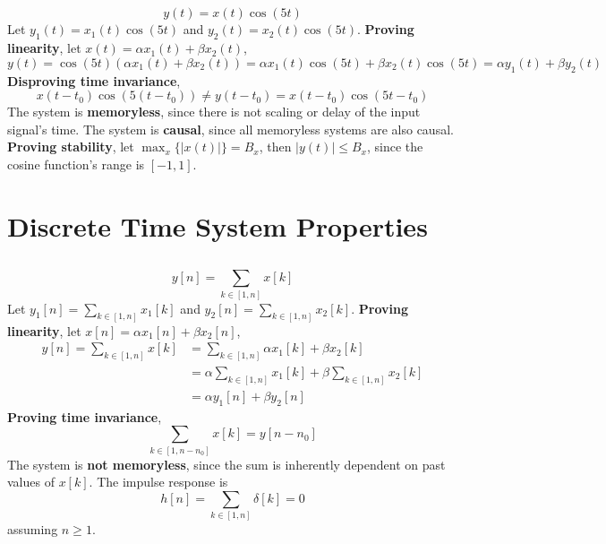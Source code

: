 \documentclass{article}
\begin{document}
\subsection{}

\begin{equation}
    y(t) = x(t) \cos(5t)
\end{equation}
Let \(y_1(t) = x_1(t) \cos(5t)\) and \(y_2(t) = x_2(t) \cos(5t)\).
\textbf{Proving linearity}, let \(x(t) = \alpha x_1(t) + \beta x_2(t)\),
\begin{equation}
    y(t) = \cos(5t) (\alpha x_1(t) + \beta x_2(t)) = \alpha x_1(t) \cos(5t) + \beta x_2(t) \cos(5t) = \alpha y_1(t) + \beta y_2(t)
\end{equation}
\textbf{Disproving time invariance},
\begin{equation}
    x(t - t_0) \cos(5 (t - t_0)) \neq y(t - t_0) = x(t - t_0) \cos(5t - t_0)
\end{equation}
The system is \textbf{memoryless}, since there is not scaling or delay of the input signal's time.
The system is \textbf{causal}, since all memoryless systems are also causal.
\textbf{Proving stability}, let \(\max_x\{|x(t)|\} = B_x\), then \(|y(t)| \leqslant B_x\), since the cosine function's range is \([-1, 1]\).

\section{Discrete Time System Properties}

\subsection{}

\begin{equation}
    y[n] = \sum_{k \in [1, n]} x[k]
\end{equation}
Let \(y_1[n] = \sum_{k \in [1, n]} x_1[k]\) and \(y_2[n] = \sum_{k \in [1, n]} x_2[k]\).
\textbf{Proving linearity}, let \(x[n] = \alpha x_1[n] + \beta x_2[n]\),
\begin{align}
    y[n] = \sum_{k \in [1, n]} x[k] &= \sum_{k \in [1, n]} \alpha x_1[k] + \beta x_2[k] \\
    &= \alpha \sum_{k \in [1, n]} x_1[k] + \beta \sum_{k \in [1, n]} x_2[k] \\
    &= \alpha y_1[n] + \beta y_2[n]
\end{align}
\textbf{Proving time invariance},
\begin{equation}
    \sum_{k \in [1, n - n_0]} x[k] = y[n - n_0]
\end{equation}
The system is \textbf{not memoryless}, since the sum is inherently dependent on past values of \(x[k]\).
The impulse response is
\begin{equation}
    h[n] = \sum_{k \in [1, n]} \delta[k] = 0
\end{equation}
assuming \(n \geqslant 1\).
\end{document}
